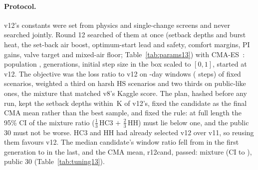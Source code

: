 \documentclass{article}
\begin{document}
\paragraph{Protocol.} v12's constants were set from physics and single-change screens and never searched jointly. Round 12 searched \RTwNParams{} of them at once (setback depths and burst heat, the set-back air boost, optimum-start lead and safety, comfort margins, PI gains, valve target and mixed-air floor; Table~\ref{tab:params13}) with CMA-ES~\citep{hansen2016cma}: population \RTwPop, \RTwGens{} generations, initial step size \RTwSigmaZero{} in the box scaled to $[0,1]$, started at v12. The objective was the loss ratio to v12 on \RTwWinDays-day windows (\RTwWinSteps{} steps) of \RTwNWin{} fixed scenarios, weighted a third on \RTwNWinHarsh{} harsh HS scenarios and two thirds on \RTwNWinPub{} public-like ones, the mixture that matched v8's Kaggle score. The plan, hashed before any run, kept the setback depths within \RTwDepthMaxDeeper\,K of v12's, fixed the candidate as the final CMA mean rather than the best sample, and fixed the rule: at full length the 95\% CI of the mixture ratio ($\tfrac13$\,HC3 $+$ $\tfrac23$\,HH) must lie below one, and the public 30 must not be worse. HC3 and HH had already selected v12 over v11, so reusing them favours v12. The median candidate's window ratio fell from \RTwMedFirst{} in the first generation to \RTwMedLast{} in the last, and the CMA mean, r12cand, passed: mixture \RTwCandMix{} (CI \RTwCandMixLo{} to \RTwCandMixHi), public 30 \RTwCandPub{} (Table~\ref{tab:tuning13}).
\end{document}
